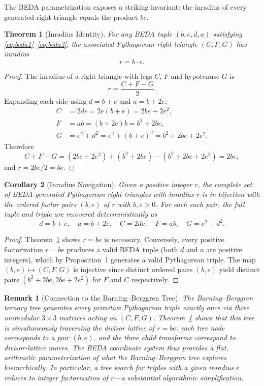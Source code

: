 \documentclass[12pt]{article}
\newtheorem{theorem}{Theorem}
\newtheorem{corollary}[theorem]{Corollary}
\newtheorem{remark}{Remark}
\begin{document}
The BEDA parametrization exposes a striking invariant: the inradius of every generated right triangle equals the product $be$.

\begin{theorem}[Inradius Identity]\label{thm:inradius}
For any BEDA tuple $(b, e, d, a)$ satisfying \eqref{eq:beda1}--\eqref{eq:beda2}, the associated Pythagorean right triangle $(C, F, G)$ has inradius
\[
  r = b \cdot e.
\]
\end{theorem}

\begin{proof}
The inradius of a right triangle with legs $C$, $F$ and hypotenuse $G$ is
\[
  r = \frac{C + F - G}{2}.
\]
Expanding each side using $d = b+e$ and $a = b+2e$:
\begin{align*}
  C &= 2de = 2e(b+e) = 2be + 2e^2,\\
  F &= ab = (b+2e)b = b^2 + 2be,\\
  G &= e^2 + d^2 = e^2 + (b+e)^2 = b^2 + 2be + 2e^2.
\end{align*}
Therefore
\[
  C + F - G = (2be + 2e^2) + (b^2 + 2be) - (b^2 + 2be + 2e^2) = 2be,
\]
and $r = 2be/2 = be$.
\end{proof}

\begin{corollary}[Inradius Navigation]\label{cor:nav}
Given a positive integer $r$, the complete set of BEDA-generated Pythagorean right triangles with inradius $r$ is in bijection with the ordered factor pairs $(b, e)$ of $r$ with $b, e > 0$.  For each such pair, the full tuple and triple are recovered deterministically as
\[
  d = b + e, \quad a = b + 2e, \quad C = 2de, \quad F = ab, \quad G = e^2 + d^2.
\]
\end{corollary}

\begin{proof}
Theorem~\ref{thm:inradius} shows $r = be$ is necessary.  Conversely, every positive factorization $r = be$ produces a valid BEDA tuple (both $d$ and $a$ are positive integers), which by Proposition~1 generates a valid Pythagorean triple.  The map $(b,e) \mapsto (C,F,G)$ is injective since distinct ordered pairs $(b,e)$ yield distinct pairs $(b^2{+}2be, 2be{+}2e^2)$ for $F$ and $C$ respectively.
\end{proof}

\begin{remark}[Connection to the Barning--Berggren Tree]
The Barning--Berggren ternary tree \cite{barning,berggren} generates every primitive Pythagorean triple exactly once via three unimodular $3{\times}3$ matrices acting on $(C,F,G)$.  Theorem~\ref{thm:inradius} shows that this tree is simultaneously traversing the \emph{divisor lattice} of $r = be$: each tree node corresponds to a pair $(b,e)$, and the three child transforms correspond to divisor-lattice moves.  The BEDA coordinate system thus provides a flat, arithmetic parameterization of what the Barning--Berggren tree explores hierarchically.  In particular, a tree search for triples with a given inradius $r$ reduces to integer factorization of $r$---a substantial algorithmic simplification.
\end{remark}
\end{document}
